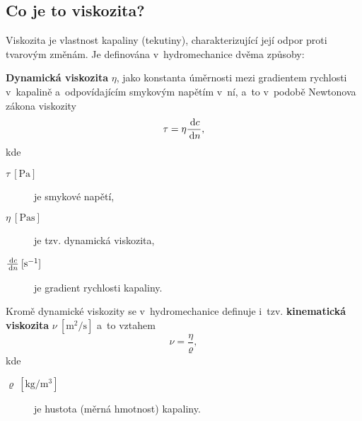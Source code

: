 
\subsection{Co je to viskozita?}
Viskozita je vlastnost kapaliny (tekutiny), charakterizující její odpor proti tvarovým změnám. Je definována v~hydromechanice dvěma způsoby:

\textbf{Dynamická viskozita} $\eta$, jako konstanta úměrnosti mezi gradientem rychlosti v~kapalině a~odpovídajícím smykovým napětím v~ní, a~to v~podobě Newtonova zákona viskozity
\begin{equation}
	\tau = \eta \frac{\,\mathrm{d} c}{\,\mathrm{d} n},
\end{equation}
kde
\begin{description}
	\item[{$\tau\:[\si{\pascal}]$}] je smykové napětí,
	\item[{$\eta\:[\si{\pascal\second}]$}] je tzv. dynamická viskozita,
	\item[{$\tfrac{\,\mathrm{d} c}{\,\mathrm{d} n}\:[\si{\per\second}]$}] je gradient rychlosti kapaliny.
\end{description}

Kromě dynamické viskozity se v~hydromechanice definuje i~tzv. \textbf{kinematická viskozita} $\nu\:[\si{\meter\squared\per\second}]$ a~to vztahem
\begin{equation}
	\nu = \frac{\eta}{\varrho},
\end{equation}
kde
\begin{description}
	\item[{$\varrho\:[\si{\kilogram\per\meter\cubed}]$}] je hustota (měrná hmotnost) kapaliny.
\end{description}
